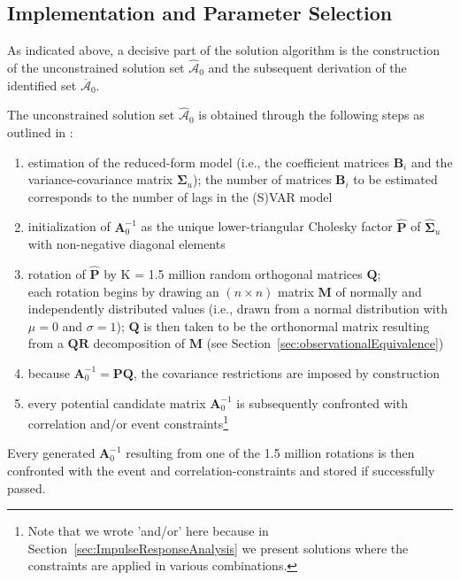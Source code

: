 \documentclass[a4paper,11pt,listof=nochaptergap,oneside,pointednumbers,bibtotoc,bigheadings,liststotoc,hidelinks]{scrbook}
\theoremstyle{mysatz}
\theoremstyle{mydefinition}
\theoremstyle{mytheorem}
\theoremstyle{mybemerkung}
\let\oldhat\hat
\newcommand{\vect}[1]{\boldsymbol{\mathbf{#1}}}
\newcommand{\hatt}[1]{\oldhat{\boldsymbol{\mathbf{#1}}}}
\begin{document}
\subsection{Implementation and Parameter Selection}
\label{sec:solutionAlgorithm}
As indicated above, a decisive part of the solution algorithm is the construction of the unconstrained solution set $\hatt{\mathcal{A}}_0$ and the subsequent derivation of the identified set $\overline{\vect{\mathcal{A}}}_0$.

The unconstrained solution set $\hatt{\mathcal{A}}_0$ is obtained through the following steps as outlined in \citet{ludvigsonetal:19}:
\begin{enumerate}[i]
	\item estimation of the reduced-form model (i.e., the coefficient matrices $\vect{B}_i$ and the variance-covariance matrix $\vect{\Sigma}_u$); the number of matrices $\vect{B}_i$ to be estimated corresponds to the number of lags in the (S)VAR model
	\item initialization of $\vect{A}_0^{-1}$ as the unique lower-triangular Cholesky factor $\hatt{\vect{P}}$ of $\hatt{\vect{\Sigma}}_u$ with non-negative diagonal elements
	\item rotation of $\hatt{\vect{P}}$ by K = 1.5 million random orthogonal matrices $\vect{Q}$;\\
	 each rotation begins by drawing an $(n \times n)$ matrix $\vect{M}$ of normally and independently distributed values (i.e., drawn from a normal distribution with $\mu = 0$ and $\sigma = 1$); $\vect{Q}$ is then taken to be the orthonormal matrix resulting from a $\vect{Q}\vect{R}$ decomposition of $\vect{M}$ (see Section~\ref{sec:observationalEquivalence})
	 \item because $\vect{A}_0^{-1} = \vect{P}\vect{Q}$, the covariance restrictions are imposed by construction 
	 \item every potential candidate matrix $\vect{A}_0^{-1}$ is subsequently confronted with correlation and/or event constraints\footnote{Note that we wrote 'and/or' here because in Section~\ref{sec:ImpulseResponseAnalysis} we present solutions where the constraints are applied in various combinations.}
\end{enumerate}

Every generated $\vect{A}_0^{-1}$ resulting from one of the 1.5 million rotations is then confronted with the event and correlation-constraints and stored if successfully passed. 
\end{document}
